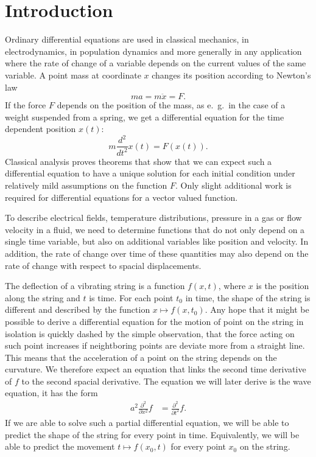 %
%
%
\chapter*{Introduction}
Ordinary differential equations are used in classical mechanics,
in electrodynamics, in population dynamics and more generally in any
application where the rate of change of a variable depends on the current
values of the same variable.
A point mass at coordinate $x$ changes its position according to 
Newton's law
\[
ma=m\ddot x=F.
\]
If the force $F$ depends on the position of the mass, as e.~g.~in the
case of a weight suspended from a spring, we get a differential equation
for the time dependent position $x(t)$:
\[
m\frac{d^2}{dt^2}x(t)=F(x(t)).
\]
Classical analysis proves theorems that show that we can expect such
a differential equation to have a unique solution for each
initial condition under relatively mild assumptions on the function $F$.
Only slight additional work is required for differential equations 
for a vector valued function.

To describe electrical fields, temperature distributions, pressure
in a gas or flow velocity in a fluid, we need to determine functions 
that do not only depend on a single time variable, but also on additional
variables like position and velocity.
In addition, the rate of change over time of these quantities may also depend
on the rate of change with respect to spacial displacements.

The deflection of a vibrating string is a function $f(x,t)$, where $x$ is
the position along the string and $t$ is time.
For each point $t_0$ in time, the shape of the string is different and
described by the function $x\mapsto f(x,t_0)$.
Any hope that it might be possible to derive a differential equation
for the motion of point on the string in isolation is quickly dashed
by the simple observation, that the force acting on such point
increases if neightboring points are deviate more from a straight line.
This means that the acceleration of a point on the string depends on 
the curvature.
We therefore expect an equation that links the second time derivative of $f$
to the second spacial derivative.
The equation we will later derive is the wave equation, it has the form
\begin{align*}
a^2\frac{\partial^2}{\partial x^2}f&= \frac{\partial^2}{\partial t^2}f.
\end{align*}
If we are able to solve such a partial differential equation,
we will be able to predict the shape of the string for every point in
time.
Equivalently, we will be able to predict the movement $t\mapsto f(x_0,t)$
for every point $x_0$ on the string.

